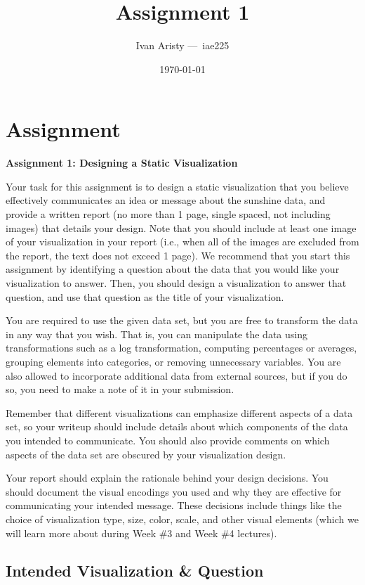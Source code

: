 \documentclass{article}
\title{Assignment 1}
\author{Ivan Aristy — iae225}
\date{\today}
\begin{document}
\maketitle

\section{Assignment}
\textbf{Assignment 1: Designing a Static Visualization}

Your task for this assignment is to design a static visualization that you believe effectively communicates an idea or message about the sunshine data, and provide a written report (no more than 1 page, single spaced, not including images) that details your design. Note that you should include at least one image of your visualization in your report (i.e., when all of the images are excluded from the report, the text does not exceed 1 page). We recommend that you start this assignment by identifying a question about the data that you would like your visualization to answer. Then, you should design a visualization to answer that question, and use that question as the title of your visualization.

You are required to use the given data set, but you are free to transform the data in any way that you wish. That is, you can manipulate the data using transformations such as a log transformation, computing percentages or averages, grouping elements into categories, or removing unnecessary variables. You are also allowed to incorporate additional data from external sources, but if you do so, you need to make a note of it in your submission.

Remember that different visualizations can emphasize different aspects of a data set, so your writeup should include details about which components of the data you intended to communicate. You should also provide comments on which aspects of the data set are obscured by your visualization design.

Your report should explain the rationale behind your design decisions. You should document the visual encodings you used and why they are effective for communicating your intended message. These decisions include things like the choice of visualization type, size, color, scale, and other visual elements (which we will learn more about during Week \#3 and Week \#4 lectures).

\newpage

\subsection{Intended Visualization \& Question}
\end{document}
